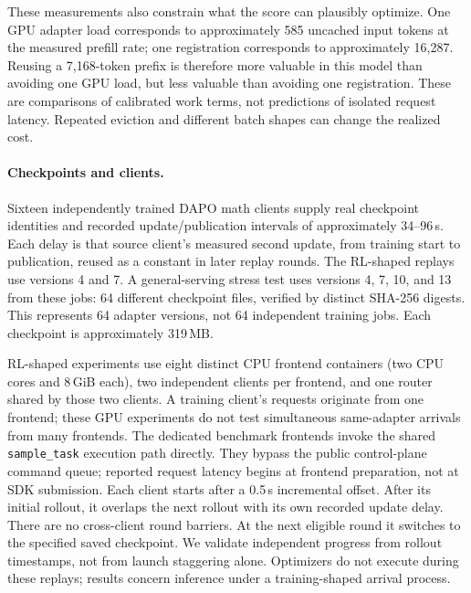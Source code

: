 These measurements also constrain what the score can plausibly optimize. One
GPU adapter load corresponds to approximately 585 uncached input tokens at the
measured prefill rate; one registration corresponds to approximately 16,287.
Reusing a 7,168-token prefix is therefore more valuable in this model than
avoiding one GPU load, but less valuable than avoiding one registration. These
are comparisons of calibrated work terms, not predictions of isolated request
latency. Repeated eviction and different batch shapes can change the realized
cost.

\paragraph{Checkpoints and clients.}
Sixteen independently trained DAPO math clients supply real checkpoint
identities and recorded update/publication intervals of approximately 34--96\,s.
Each delay is that source client's measured second update, from training start
to publication, reused as a constant in later replay rounds.
The RL-shaped replays use versions 4 and 7. A general-serving stress test uses
versions 4, 7, 10, and 13 from these jobs: 64 different checkpoint files,
verified by distinct SHA-256 digests. This represents 64 adapter versions, not
64 independent training jobs. Each checkpoint is approximately 319\,MB.

RL-shaped experiments use eight distinct CPU frontend containers (two CPU cores
and 8\,GiB each), two independent clients per frontend, and one router shared by
those two clients. A training client's requests originate from one frontend;
these GPU experiments do not test simultaneous same-adapter arrivals from many
frontends.
The dedicated benchmark frontends invoke the shared \texttt{sample\_task}
execution path directly. They bypass the public control-plane command queue;
reported request latency begins at frontend preparation, not at SDK submission.
Each client starts after a 0.5\,s incremental offset. After its initial rollout,
it overlaps the next rollout with its own recorded update delay. There are no
cross-client round barriers. At the next eligible round it switches to the
specified saved checkpoint. We validate independent progress from rollout
timestamps, not from launch staggering alone. Optimizers do not execute during
these replays; results concern inference under a training-shaped arrival process.

